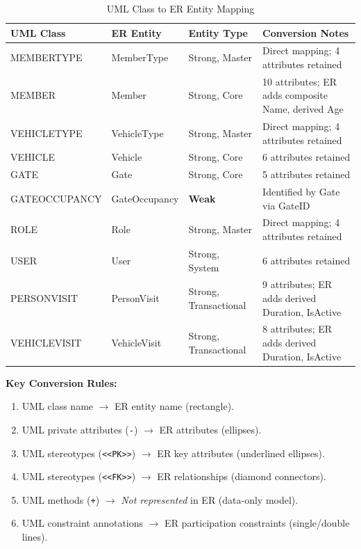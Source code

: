 \documentclass[a4paper, 12pt]{article}
\begin{document}
\begin{table}[H]
\centering
\caption{UML Class to ER Entity Mapping}
\label{tab:class-to-entity}
\begin{tabularx}{\textwidth}{l l l X}
\toprule
\textbf{UML Class} & \textbf{ER Entity} & \textbf{Entity Type} & \textbf{Conversion Notes} \\
\midrule
MEMBERTYPE & MemberType & Strong, Master & Direct mapping; 4 attributes retained \\
MEMBER & Member & Strong, Core & 10 attributes; ER adds composite Name, derived Age \\
VEHICLETYPE & VehicleType & Strong, Master & Direct mapping; 4 attributes retained \\
VEHICLE & Vehicle & Strong, Core & 6 attributes retained \\
GATE & Gate & Strong, Core & 5 attributes retained \\
GATEOCCUPANCY & GateOccupancy & \textbf{Weak} & Identified by Gate via GateID \\
ROLE & Role & Strong, Master & Direct mapping; 4 attributes retained \\
USER & User & Strong, System & 6 attributes retained \\
PERSONVISIT & PersonVisit & Strong, Transactional & 9 attributes; ER adds derived Duration, IsActive \\
VEHICLEVISIT & VehicleVisit & Strong, Transactional & 8 attributes; ER adds derived Duration, IsActive \\
\bottomrule
\end{tabularx}
\end{table}

\textbf{Key Conversion Rules:}
\begin{enumerate}[leftmargin=*, nosep]
    \item UML class name $\rightarrow$ ER entity name (rectangle).
    \item UML private attributes (\texttt{-}) $\rightarrow$ ER attributes (ellipses).
    \item UML stereotypes (\texttt{<<PK>>}) $\rightarrow$ ER key attributes (underlined ellipses).
    \item UML stereotypes (\texttt{<<FK>>}) $\rightarrow$ ER relationships (diamond connectors).
    \item UML methods (\texttt{+}) $\rightarrow$ \textit{Not represented} in ER (data-only model).
    \item UML constraint annotations $\rightarrow$ ER participation constraints (single/double lines).
\end{enumerate}
\end{document}
